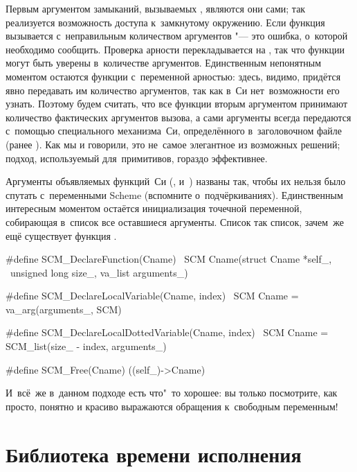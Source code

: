 Первым аргументом замыканий, вызываемых , являются они сами;
так реализуется возможность доступа к~замкнутому окружению. Если функция
вызывается с~неправильным количеством аргументов "--- это ошибка, о~которой
необходимо сообщить. Проверка арности перекладывается на , так
что функции могут быть уверены в~количестве аргументов. Единственным непонятным
моментом остаются функции с~переменной арностью: здесь, видимо, придётся явно
передавать им количество аргументов, так как в~Си нет~возможности его узнать.
Поэтому будем считать, что все функции вторым аргументом принимают количество
фактических аргументов вызова, а сами аргументы всегда передаются с~помощью
специального механизма~Си, определённого в~заголовочном файле 
(ранее ). Как мы и говорили, это не~самое элегантное из
возможных решений; подход, используемый для~примитивов, гораздо эффективнее.

Аргументы объявляемых функций~Си (,  и~)
названы так, чтобы их нельзя было спутать с~переменными Scheme (вспомните
о~подчёркиваниях). Единственным интересным моментом остаётся инициализация
точечной переменной, собирающая в~список все оставшиеся аргументы. Список так
список, зачем~же ещё существует функция .

\begin{code:c}
#define SCM_DeclareFunction(Cname) \ 
  SCM Cname(struct Cname *self_,   \
            unsigned long size_, va_list arguments_)

#define SCM_DeclareLocalVariable(Cname, index) \
  SCM Cname = va_arg(arguments_, SCM)

#define SCM_DeclareLocalDottedVariable(Cname, index) \
  SCM Cname = SCM_list(size_ - index, arguments_)

#define SCM_Free(Cname) ((self_)->Cname)
\end{code:c}

И~всё~же в~данном подходе есть что"~то хорошее: вы только посмотрите, как
просто, понятно и красиво выражаются обращения к~свободным переменным!


\section{Библиотека времени исполнения}\label{cc/sect:runtime}


